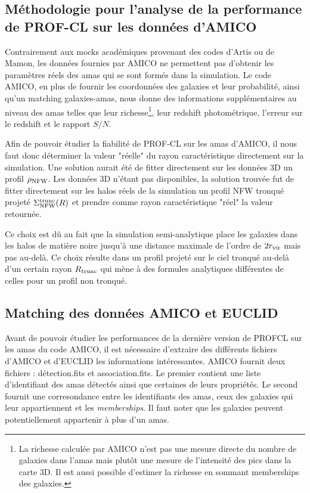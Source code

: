 \documentclass[a4paper,11pt]{article}
\numberwithin{equation}{section}
\begin{document}
    \subsection{Méthodologie pour l'analyse de la performance de PROF-CL sur les données d'AMICO}
      Contrairement aux mocks académiques provenant des codes d'Artis ou de Mamon, les données fournies par AMICO ne permettent pas d'obtenir les paramètres réels des amas qui se sont formés dans la simulation. Le code AMICO, en plus de fournir les coordonnées des galaxies et leur probabilité, ainsi qu'un matching galaxies-amas, nous donne des informations supplémentaires au niveau des amas telles que leur richesse\footnote{La richesse calculée par AMICO n'est pas une mesure directe du nombre de galaxies dans l'amas mais plutôt une mesure de l'intensité des pics dans la carte 3D. Il est aussi possible d'estimer la richesse en sommant memberships des galaxies.}, leur redshift photométrique, l'erreur sur le redshift et le rapport $S/N$.\par
      Afin de pouvoir étudier la fiabilité de PROF-CL sur les amas d'AMICO, il nous faut donc déterminer la valeur "réelle" du rayon caractéristique directement sur la simulation. Une solution aurait été de fitter directement sur les données 3D un profil $\rho_{\rm{NFW}}$. Les données 3D n'étant pas disponibles, la solution trouvée fut de fitter directement sur les halos réels de la simulation un profil NFW tronqué projeté $\Sigma_{\rm{NFW}}^{\rm{trunc}} (R)$ et prendre comme rayon caractéristique "réel" la valeur retournée.\par
      Ce choix est dû au fait que la simulation semi-analytique place les galaxies dans les halos de matière noire jusqu'à une distance maximale de l'ordre de $2 r_{\rm{vir}}$ mais pas au-delà. Ce choix résulte dans un profil projeté sur le ciel tronqué au-delà d'un certain rayon $R_{\rm{trunc}}$ qui mène à des formules analytiques différentes de celles pour un profil non tronqué\cite{Mamon2010}. 
      
    \subsection{Matching des données AMICO et EUCLID}
      Avant de pouvoir étudier les performances de la dernière version de PROFCL sur les amas du code AMICO, il est nécessaire d'extraire des différents fichiers d'AMICO et d'EUCLID les informations intéressantes. AMICO fournit deux fichiers : détection.fits et association.fits. Le premier contient une liste d'identifiant des amas détectés ainsi que certaines de leurs propriétés. Le second fournit une corresondance entre les identifiants des amas, ceux des galaxies qui leur appartiennent et les \textit{memberships}. Il faut noter que les galaxies peuvent potentiellement appartenir à plus d'un amas.
\end{document}
